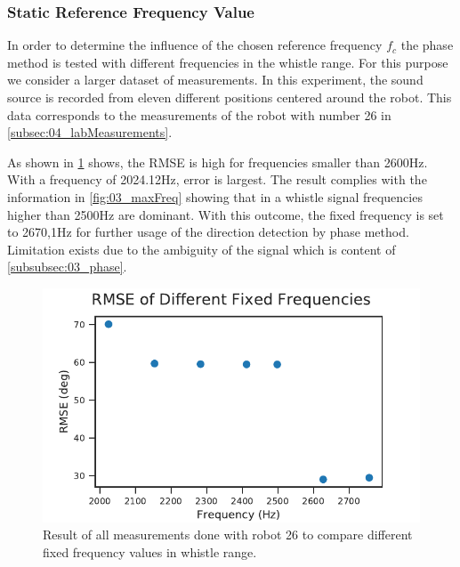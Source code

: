 \subsubsection*{Static Reference Frequency Value}
\label{subsubsec:04_fixedFrequencyVal}


In order to determine the influence of the chosen reference frequency $f_c$
the phase method is tested with different frequencies in the whistle range.
For this purpose we consider a larger dataset of
 measurements. In this experiment, the sound
source is recorded from eleven different positions centered around the
robot. This data corresponds to the measurements of
the robot with number 26 in \cref{subsec:04_labMeasurements}.

As shown in \cref{fig:04_diffFc} shows, the \ac{RMSE} is high for
frequencies smaller than 2600\si{\hertz}.
With a frequency of 2024.12\si{\hertz}, error is largest.
The result complies with the information in \cref{fig:03_maxFreq} showing that
in a whistle signal frequencies higher than 2500\si{\hertz} are dominant.
With this outcome, the fixed frequency is set to 2670,1\si{\hertz}
for further usage of the direction detection by phase method.
Limitation exists due to the ambiguity of the signal which is
content of \cref{subsubsec:03_phase}.
\begin{figure}[ht]
	\centering
		\includegraphics[]{figures/evaluation/phase_fc_rmse}
	\caption{Result of all measurements done with robot 26 to compare different
	fixed frequency values in whistle range.}
	\label{fig:04_diffFc}
\end{figure}
